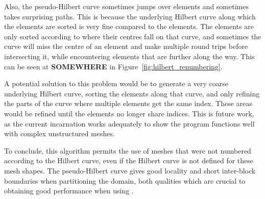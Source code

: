 Also, the pseudo-Hilbert curve sometimes jumps over elements and sometimes takes surprising paths.
This is because the underlying Hilbert curve along which the elements are sorted is very fine
compared to the elements. The elements are only sorted according to where their centres fall on that
curve, and sometimes the curve will miss the centre of an element and make multiple round trips
before intersecting it, while encountering elements that are further along the way. This can be seen
at \textcolor{vs_red}{\textbf{SOMEWHERE}} in Figure~\ref{fig:hilbert_renumbering}.

A potential solution to this problem would be to generate a very coarse underlying Hilbert curve,
sorting the elements along that curve, and only refining the parts of the curve where multiple
elements get the same index. These areas would be refined until the elements no longer share
indices. This is future work, as the current incarnation works adequately to show the program
functions well with complex unstructured meshes.

To conclude, this algorithm permits the use of meshes that were not numbered according to the
Hilbert curve, even if the Hilbert curve is not defined for these mesh shapes. The pseudo-Hilbert
curve gives good locality and short inter-block boundaries when partitioning the domain, both
qualities which are crucial to obtaining good performance when using .
